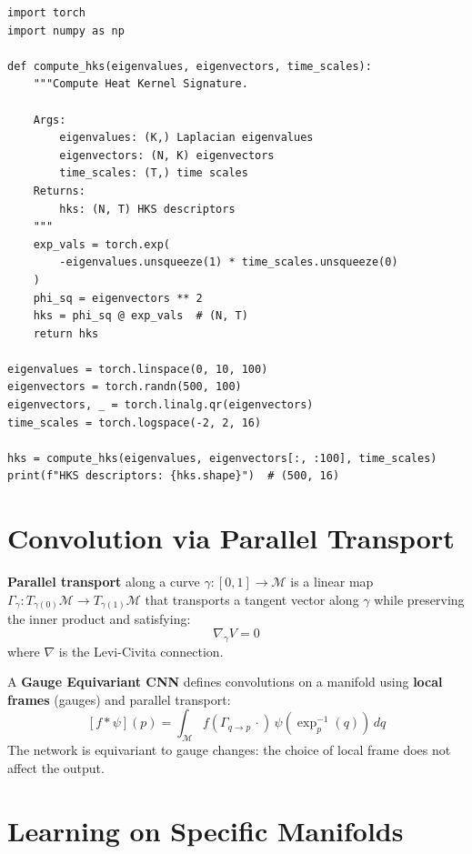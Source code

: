 \begin{codeblock}[title=\textbf{Computing HKS on a mesh}]
\begin{verbatim}
import torch
import numpy as np

def compute_hks(eigenvalues, eigenvectors, time_scales):
    """Compute Heat Kernel Signature.

    Args:
        eigenvalues: (K,) Laplacian eigenvalues
        eigenvectors: (N, K) eigenvectors
        time_scales: (T,) time scales
    Returns:
        hks: (N, T) HKS descriptors
    """
    exp_vals = torch.exp(
        -eigenvalues.unsqueeze(1) * time_scales.unsqueeze(0)
    )
    phi_sq = eigenvectors ** 2
    hks = phi_sq @ exp_vals  # (N, T)
    return hks

eigenvalues = torch.linspace(0, 10, 100)
eigenvectors = torch.randn(500, 100)
eigenvectors, _ = torch.linalg.qr(eigenvectors)
time_scales = torch.logspace(-2, 2, 16)

hks = compute_hks(eigenvalues, eigenvectors[:, :100], time_scales)
print(f"HKS descriptors: {hks.shape}")  # (500, 16)
\end{verbatim}
\end{codeblock}

\section{Convolution via Parallel Transport}

\begin{definition}
\textbf{Parallel transport} along a curve $\gamma: [0,1] \to \mathcal{M}$
is a linear map $\Gamma_\gamma: T_{\gamma(0)}\mathcal{M} \to
T_{\gamma(1)}\mathcal{M}$ that transports a tangent vector along $\gamma$
while preserving the inner product and satisfying:
\[
    \nabla_{\dot{\gamma}} V = 0
\]
where $\nabla$ is the Levi-Civita connection.
\end{definition}

\begin{definition}
A \textbf{Gauge Equivariant CNN} defines convolutions on a manifold using
\textbf{local frames} (gauges) and parallel transport:
\[
    [f * \psi](p) = \int_{\mathcal{M}} f(\Gamma_{q \to p}\, \cdot)\,
    \psi(\exp_p^{-1}(q))\, dq
\]
The network is equivariant to gauge changes: the choice of local frame does
not affect the output.
\end{definition}

\section{Learning on Specific Manifolds}

